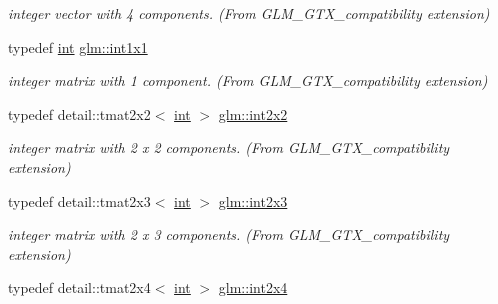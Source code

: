 \begin{DoxyCompactItemize}
\begin{DoxyCompactList}\small\item\em integer vector with 4 components. (From G\+L\+M\+\_\+\+G\+T\+X\+\_\+compatibility extension) \end{DoxyCompactList}\item 
\hypertarget{group__gtx__compatibility_ga09016a637a3cd093c22e6188080ac750}{}typedef \hyperlink{_s_d_l__thread_8h_a6a64f9be4433e4de6e2f2f548cf3c08e}{int} \hyperlink{group__gtx__compatibility_ga09016a637a3cd093c22e6188080ac750}{glm\+::int1x1}\label{group__gtx__compatibility_ga09016a637a3cd093c22e6188080ac750}

\begin{DoxyCompactList}\small\item\em integer matrix with 1 component. (From G\+L\+M\+\_\+\+G\+T\+X\+\_\+compatibility extension) \end{DoxyCompactList}\item 
\hypertarget{group__gtx__compatibility_gad178c2f6fdff64b91cac9b32db26bb43}{}typedef detail\+::tmat2x2$<$ \hyperlink{_s_d_l__thread_8h_a6a64f9be4433e4de6e2f2f548cf3c08e}{int} $>$ \hyperlink{group__gtx__compatibility_gad178c2f6fdff64b91cac9b32db26bb43}{glm\+::int2x2}\label{group__gtx__compatibility_gad178c2f6fdff64b91cac9b32db26bb43}

\begin{DoxyCompactList}\small\item\em integer matrix with 2 x 2 components. (From G\+L\+M\+\_\+\+G\+T\+X\+\_\+compatibility extension) \end{DoxyCompactList}\item 
\hypertarget{group__gtx__compatibility_ga33bfdec07fd73c7b2f3fb5e55bfd97dc}{}typedef detail\+::tmat2x3$<$ \hyperlink{_s_d_l__thread_8h_a6a64f9be4433e4de6e2f2f548cf3c08e}{int} $>$ \hyperlink{group__gtx__compatibility_ga33bfdec07fd73c7b2f3fb5e55bfd97dc}{glm\+::int2x3}\label{group__gtx__compatibility_ga33bfdec07fd73c7b2f3fb5e55bfd97dc}

\begin{DoxyCompactList}\small\item\em integer matrix with 2 x 3 components. (From G\+L\+M\+\_\+\+G\+T\+X\+\_\+compatibility extension) \end{DoxyCompactList}\item 
\hypertarget{group__gtx__compatibility_ga06fb324b3a464438ca98496b8a0422ce}{}typedef detail\+::tmat2x4$<$ \hyperlink{_s_d_l__thread_8h_a6a64f9be4433e4de6e2f2f548cf3c08e}{int} $>$ \hyperlink{group__gtx__compatibility_ga06fb324b3a464438ca98496b8a0422ce}{glm\+::int2x4}\label{group__gtx__compatibility_ga06fb324b3a464438ca98496b8a0422ce}


\end{DoxyCompactItemize}
